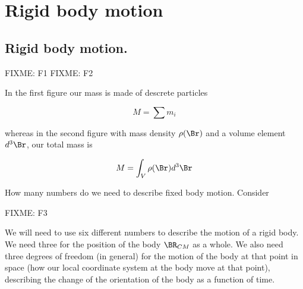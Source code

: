 
%


\chapter{Rigid body motion}
\label{chap:rigidBodyMotion}
{}
\date{Mar 7, 2012}

\beginArtWithToc

\section{Rigid body motion.}

FIXME: F1
FIXME: F2

In the first figure our mass is made of descrete particles

\begin{equation}\label{eqn:rigidBodyMotion:20}
M = \sum m_i
\end{equation}

whereas in the second figure with mass density $\rho(\Br)$ and a volume element $d^3\Br$, our total mass is

\begin{equation}\label{eqn:rigidBodyMotion:40}
M = \int_V \rho(\Br) d^3\Br
\end{equation}

How many numbers do we need to describe fixed body motion.  Consider 

FIXME: F3

We will need to use six different numbers to describe the motion of a rigid body.  We need three for the position of the body $\BR_{CM}$ as a whole.  We also need three degrees of freedom (in general) for the motion of the body at that point in space (how our local coordinate system at the body move at that point), describing the change of the orientation of the body as a function of time.

